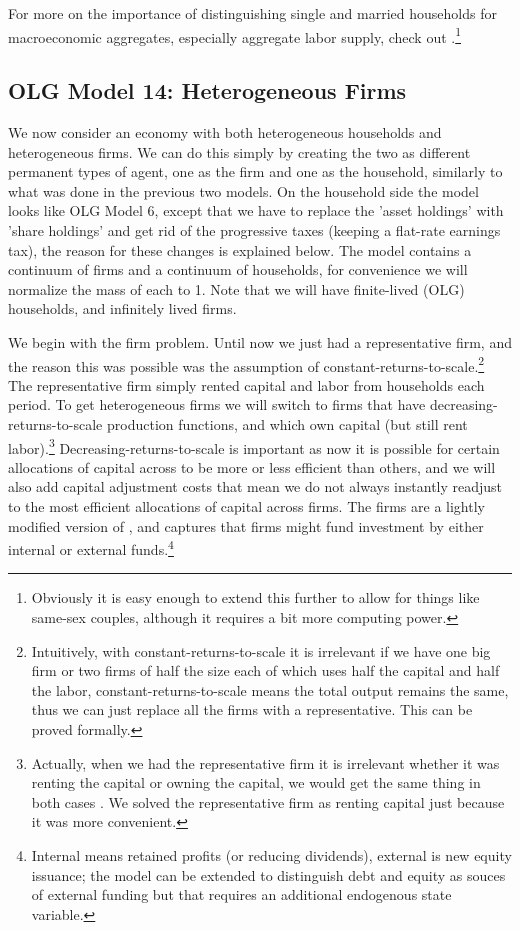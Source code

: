 For more on the importance of distinguishing single and married households for macroeconomic aggregates, especially aggregate labor supply, check out \cite*{BorellaDeNardiYang2018}.\footnote{Obviously it is easy enough to extend this further to allow for things like same-sex couples, although it requires a bit more computing power.}


\subsection{OLG Model 14: Heterogeneous Firms}
We now consider an economy with both heterogeneous households and heterogeneous firms. We can do this simply by creating the two as different permanent types of agent, one as the firm and one as the household, similarly to what was done in the previous two models. On the household side the model looks like OLG Model 6, except that we have to replace the 'asset holdings' with 'share holdings' and get rid of the progressive taxes (keeping a flat-rate earnings tax), the reason for these changes is explained below. The model contains a continuum of firms and a continuum of households, for convenience we will normalize the mass of each to 1. Note that we will have finite-lived (OLG) households, and infinitely lived firms.

We begin with the firm problem. Until now we just had a representative firm, and the reason this was possible was the assumption of constant-returns-to-scale.\footnote{Intuitively, with constant-returns-to-scale it is irrelevant if we have one big firm or two firms of half the size each of which uses half the capital and half the labor, constant-returns-to-scale means the total output remains the same, thus we can just replace all the firms with a representative. This can be proved formally.} The representative firm simply rented capital and labor from households each period. To get heterogeneous firms we will switch to firms that have decreasing-returns-to-scale production functions, and which own capital (but still rent labor).\footnote{Actually, when we had the representative firm it is irrelevant whether it was renting the capital or owning the capital, we would get the same thing in both cases \citep*{CarcelesPovedaCoenPirani2010}. We solved the representative firm as renting capital just because it was more convenient.}  Decreasing-returns-to-scale is important as now it is possible for certain allocations of capital across to be more or less efficient than others, and we will also add capital adjustment costs that mean we do not always instantly readjust to the most efficient allocations of capital across firms. The firms are a lightly modified version of \cite{GourioMiao2010}, and captures that firms might fund investment by either internal or external funds.\footnote{Internal means retained profits (or reducing dividends), external is new equity issuance; the model can be extended to distinguish debt and equity as souces of external funding but that requires an additional endogenous state variable.}

